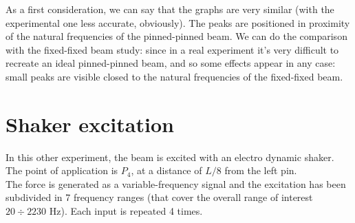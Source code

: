 \documentclass[11pt,a4paper]{article}
\begin{document}
\begin{enumerate}
	As a first consideration, we can say that the graphs are very similar (with the experimental one less accurate, obviously). The peaks are positioned in proximity of the natural frequencies of the pinned-pinned beam.
	We can do the comparison with the fixed-fixed beam study: since in a real experiment it's very difficult to recreate an ideal pinned-pinned beam, and so some effects appear in any case: small peaks are visible closed to the natural frequencies of the fixed-fixed beam.
\end{enumerate}	



\newpage
\section{Shaker excitation}
In this other experiment, the beam is excited with an electro dynamic shaker. The point of application is $P_4$, at a distance of $L/8$ from the left pin. \\
The force is generated as a variable-frequency signal and the excitation has been subdivided in 7 frequency ranges (that cover the overall range of interest $20\div2230$ Hz). Each input is repeated 4 times.
\end{document}

